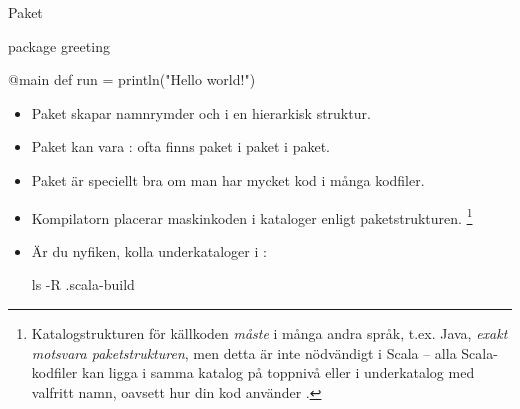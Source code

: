 \begin{Slide}{Paket}\SlideFontSmall

\begin{Code}
package greeting

@main def run = println("Hello world!")
\end{Code}

\begin{itemize}
\item Paket  skapar namnrymder och i en hierarkisk struktur. 

\item Paket kan vara : ofta finns paket i paket i paket.

\item Paket är speciellt bra om man har mycket kod i många kodfiler. 

\item Kompilatorn placerar maskinkoden i kataloger enligt paketstrukturen.%
\footnote{\SlideFontTiny Katalogstrukturen för källkoden \emph{måste} i många andra språk, t.ex. Java, \emph{exakt motsvara paketstrukturen}, men detta är inte nödvändigt i Scala -- alla Scala-kodfiler kan ligga i samma katalog på toppnivå eller i underkatalog med valfritt namn, oavsett hur din kod använder .} 
\item[] Är du nyfiken, kolla underkataloger i :
\begin{REPLsmall}
ls -R .scala-build
\end{REPLsmall}

\end{itemize}


\end{Slide}

